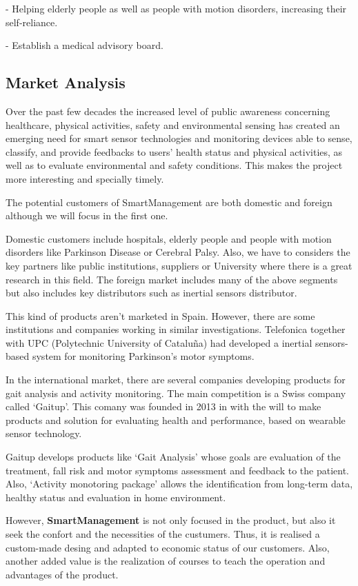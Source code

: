 -	Helping elderly people as well as people with motion disorders, increasing their self-reliance.

-	Establish a medical advisory board.

\subsection{Market Analysis}
 Over the past few decades the increased level of public awareness concerning healthcare, physical activities, safety and environmental sensing has created an emerging need for smart sensor technologies and monitoring devices able to sense, classify, and provide feedbacks to users’ health status and physical activities, as well as to evaluate environmental and safety conditions. This makes the project more interesting and specially timely.
 
 The potential customers of SmartManagement are both domestic and foreign although we will focus in the first one.
 
 Domestic customers include hospitals, elderly people and people with motion disorders like Parkinson Disease or Cerebral Palsy. Also, we have to considers the key partners like public institutions, suppliers or University where there is a great research in this field.
  The foreign market includes many of the above segments but also includes key distributors such as inertial sensors distributor.
 
 This kind of products aren’t marketed in Spain. However, there are some institutions and companies working in similar investigations. Telefonica  together with UPC (Polytechnic University of Cataluña) had developed a inertial sensors-based system for monitoring Parkinson's motor symptoms\cite{rempark}.
 
 In the international market, there are several companies developing products for gait analysis and activity monitoring. The main competition is a Swiss company called ‘Gaitup’\cite{gaitup}. This comany was founded in 2013 in with the will to make products and solution for evaluating health and performance, based on wearable sensor technology.
 
 Gaitup develops products like ‘Gait Analysis’ whose goals are evaluation of the treatment, fall risk and motor symptoms assessment and feedback to the patient. Also, ‘Activity monotoring package’ allows the identification from long-term data, healthy status and  evaluation in home environment.
 
 However, \textbf{SmartManagement} is not only focused in the product, but also it seek the confort and the necessities of the custumers. Thus, it is realised a custom-made desing and adapted to economic status of our customers. Also, another added value is the realization of courses to teach the operation and advantages of the product.
 
